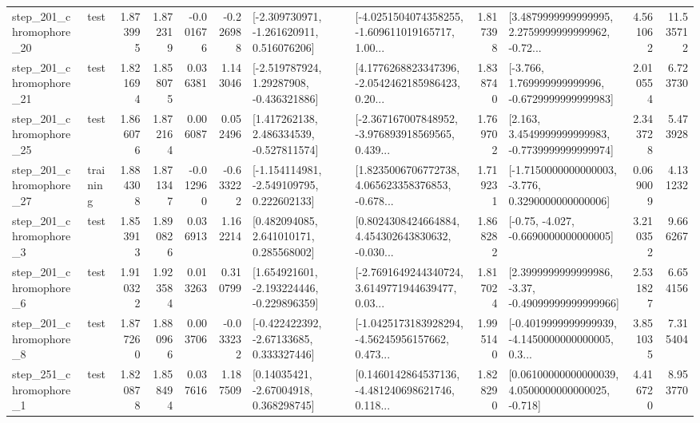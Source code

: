 \begin{tabular}{llrrrrllrlrr}
  step\_201\_chromophore\_20 &      test &      1.873995 &    1.872319 &     -0.001676 & -0.226988 &   [-2.309730971, -1.261620911, 0.516076206] &  [-4.0251504074358255, -1.609611019165717, 1.00... &       1.817398 &  [3.4879999999999995, 2.2759999999999962, -0.72... &            4.561062 &         11.535712 \\
  step\_201\_chromophore\_21 &      test &      1.821694 &    1.858075 &      0.036381 &  1.143046 &    [-2.519787924, 1.29287908, -0.436321886] &  [4.1776268823347396, -2.0542462185986423, 0.20... &       1.838740 &   [-3.766, 1.769999999999996, -0.6729999999999983] &            2.010554 &          6.723730 \\
  step\_201\_chromophore\_25 &      test &      1.866076 &    1.872164 &      0.006087 &  0.052496 &    [1.417262138, 2.486334539, -0.527811574] &  [-2.367167007848952, -3.976893918569565, 0.439... &       1.769702 &   [2.163, 3.4549999999999983, -0.7739999999999974] &            2.343728 &          5.473928 \\
  step\_201\_chromophore\_27 &  training &      1.884308 &    1.871347 &     -0.012960 & -0.633222 &   [-1.154114981, -2.549109795, 0.222602133] &  [1.8235006706772738, 4.065623358376853, -0.678... &       1.719231 &  [-1.7150000000000003, -3.776, 0.3290000000000006] &            0.069009 &          4.131232 \\
   step\_201\_chromophore\_3 &      test &      1.853913 &    1.890826 &      0.036913 &  1.162214 &     [0.482094085, 2.641010171, 0.285568002] &  [0.8024308424664884, 4.454302643830632, -0.030... &       1.868282 &               [-0.75, -4.027, -0.6690000000000005] &            3.210352 &          9.666267 \\
   step\_201\_chromophore\_6 &      test &      1.910322 &    1.923584 &      0.013263 &  0.310799 &   [1.654921601, -2.193224446, -0.229896359] &  [-2.7691649244340724, 3.6149771944639477, 0.03... &       1.817024 &  [2.3999999999999986, -3.37, -0.49099999999999966] &            2.531827 &          6.654156 \\
   step\_201\_chromophore\_8 &      test &      1.877260 &    1.880966 &      0.003706 & -0.033232 &    [-0.422422392, -2.67133685, 0.333327446] &  [-1.0425173183928294, -4.56245956157662, 0.473... &       1.995140 &  [-0.4019999999999939, -4.1450000000000005, 0.3... &            3.851035 &          7.315404 \\
   step\_251\_chromophore\_1 &      test &      1.820878 &    1.858494 &      0.037616 &  1.187509 &      [0.14035421, -2.67004918, 0.368298745] &  [0.1460142864537136, -4.481240698621746, 0.118... &       1.828290 &  [0.06100000000000039, 4.0500000000000025, -0.718] &            4.416720 &          8.953770 \\

\end{tabular}
